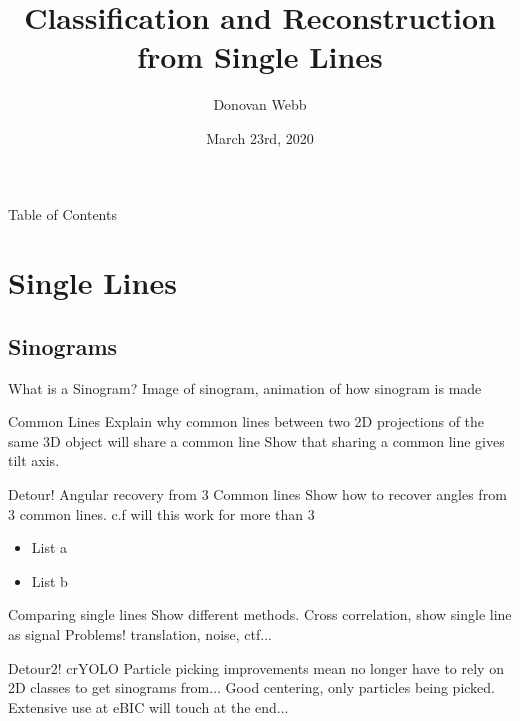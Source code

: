\documentclass[t, 11pt]{beamer}
\date{March 23rd, 2020}
\author{Donovan Webb}
\institute{eBIC/University of Bath}
\title{Classification and Reconstruction from Single Lines}
\begin{document}
\begin{frame}[plain]
  \maketitle
\end{frame}
\addtocounter{framenumber}{-1} %

\begin{frame}{Table of Contents}
  \tableofcontents[sectionstyle=show/show, hideallsubsections]
\end{frame}

\section{Single Lines}
\subsection{Sinograms}
\begin{frame}[blank]{What is a Sinogram?}
  Image of sinogram, animation of how sinogram is made
\end{frame}

\begin{frame}[blank]{Common Lines}
  Explain why common lines between two 2D projections of the same 3D object will share a common line
  Show that sharing a common line gives tilt axis.
\end{frame}

\begin{frame}[fragile]{Detour! Angular recovery from 3 Common lines}
  Show how to recover angles from 3 common lines.
  c.f will this work for more than 3

    \begin{itemize}
    \item List a
    \item List b
    \end{itemize}
\end{frame}

\begin{frame}[blank]{Comparing single lines}
  Show different methods. Cross correlation, show single line as signal
  Problems! translation, noise, ctf...
\end{frame}

\begin{frame}[blank]{Detour2! crYOLO}
  Particle picking improvements mean no longer have to rely on 2D classes to get sinograms from...
  Good centering, only particles being picked.
  Extensive use at eBIC will touch at the end...
\end{frame}
\end{document}

